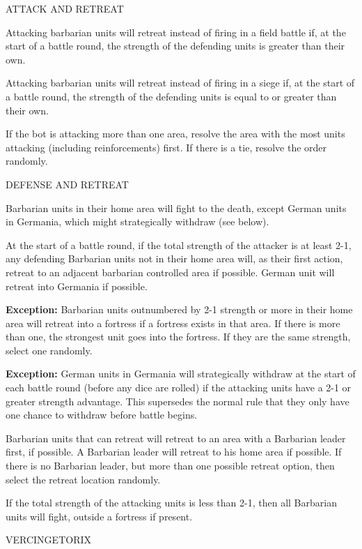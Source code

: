 \label{solitaire:attack_and_retreat}ATTACK AND RETREAT
 
Attacking barbarian units will retreat instead of firing in a field battle if, at the start of a battle round, the strength of the defending units is greater than their own.

Attacking barbarian units will retreat instead of firing in a siege if, at the start of a battle round, the strength of the defending units is equal to or greater than their own.

If the bot is attacking more than one area, resolve the area with the most units attacking (including reinforcements) first. If there is a tie, resolve the order randomly.
  
\label{solitaire:defense_and_retreat}DEFENSE AND RETREAT

Barbarian units in their home area will fight to the death, except German units in Germania, which might strategically withdraw (see below).

At the start of a battle round, if the total strength of the attacker is at least 2-1, any defending Barbarian units not in their home area will, as their first action, retreat to an adjacent barbarian controlled area if possible. German unit will retreat into Germania if possible.
    
\textbf{Exception:} Barbarian units outnumbered by 2-1 strength or more in their home area will retreat into a fortress if a fortress exists in that area. If there is more than one, the strongest unit goes into the fortress. If they are the same strength, select one randomly.
    
\textbf{Exception:} German units in Germania will strategically withdraw at the start of each battle round (before any dice are rolled) if the attacking units have a 2-1 or greater strength advantage. This supersedes the normal rule that they only have one chance to withdraw before battle begins.

Barbarian units that can retreat will retreat to an area with a Barbarian leader first, if possible. A Barbarian leader will retreat to his home area if possible. If there is no Barbarian leader, but more than one possible retreat option, then select the retreat location randomly.

If the total strength of the attacking units is less than 2-1, then all Barbarian units will fight, outside a fortress if present.

  
\label{solitaire:vercingetorix}VERCINGETORIX

